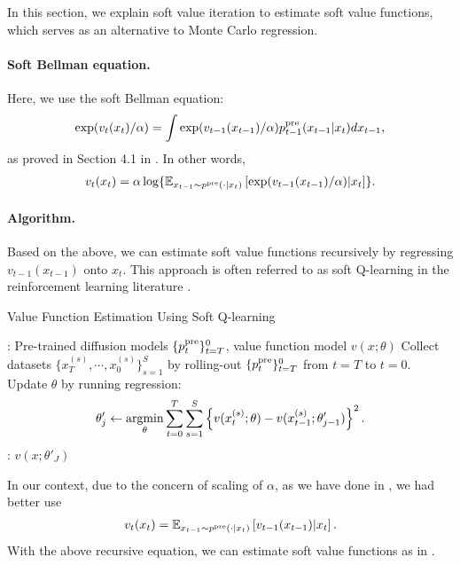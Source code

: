 In this section, we explain soft value iteration to estimate soft value functions, which serves as an alternative to Monte Carlo regression.

\paragraph{Soft Bellman equation.} Here, we use the soft Bellman equation: 
\begin{align*}
    \exp(v_t(x_t)/\alpha )=\int \exp(v_{t-1}(x_{t-1})/\alpha)p^{\mathrm{pre}}_{t-1}(x_{t-1}|x_{t}) dx_{t-1}, 
\end{align*}
as proved in Section 4.1 in \citep{uehara2024understanding}. In other words,
\begin{align*}
 v_{t}(x_{t}) = \alpha \log \{ \mathbb{E}_{x_{t-1}\sim p^{\mathrm{pre}}(\cdot|x_t) }\left [ \exp(v_{t-1}(x_{t-1})/\alpha) |x_t   \right ]\}. 
\end{align*}

\paragraph{Algorithm.} Based on the above, we can estimate soft value functions recursively by regressing $v_{t-1}(x_{t-1})$ onto $x_t$. This approach is often referred to as soft Q-learning in the reinforcement learning literature \citep{haarnoja2017reinforcement,levine2018reinforcement}. 

\begin{algorithm}[!ht]
\caption{Value Function Estimation Using Soft Q-learning}\label{alg:MC2}
\begin{algorithmic}[1]
     :  Pre-trained diffusion models $\{p^{\mathrm{pre}}_t\}^0_{t=T}$, value function model $v(x;\theta)$
    \STATE Collect datasets $\{x^{(s)}_{T},\cdots,x^{(s)}_0\}_{s=1}^S$ by rolling-out $\{ p^{\mathrm{pre}}_t\}_{t=T}^0$ from $t=T$ to $t=0$. 
    \STATE  Update $\theta$ by running regression: 
    \begin{align*}
          \theta'_j \leftarrow \mathop{\mathrm{argmin}}_{\theta}\sum_{t=0}^{T} \sum_{s=1}^S \left \{v (x^{(s)}_t;\theta) - v(x^{(s)}_{t-1};\theta'_{j-1}) \right \}^2.
    \end{align*}
     \ENDFOR  
      :  $v(x;\theta'_J)$ 
\end{algorithmic}
\end{algorithm}

In our context, due to the concern of scaling of $\alpha$, as we have done in , we had better use   
\begin{align*}
    v_{t}(x_{t}) = \mathbb{E}_{x_{t-1}\sim p^{\mathrm{pre}}(\cdot|x_t) }\left [  v_{t-1}(x_{t-1}) |x_t   \right ]. 
\end{align*}
With the above recursive equation, we can estimate soft value functions as in . 






